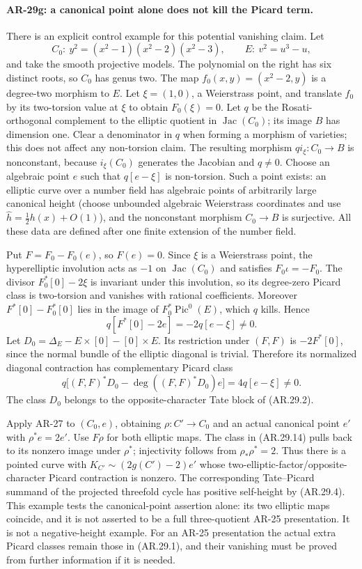 \paragraph{AR-29g: a canonical point alone does not kill the Picard term.}
There is an explicit control example for this potential vanishing claim.
Let
\[
 C_0:\ y^2=(x^2-1)(x^2-2)(x^2-3),\qquad
 E:\ v^2=u^3-u,
\]
and take the smooth projective models.  The polynomial on the
right has six distinct roots, so $C_0$ has genus two.  The map
$f_0(x,y)=(x^2-2,y)$ is a degree-two morphism to $E$.
Let $\xi=(1,0)$, a Weierstrass point, and translate $f_0$ by
its two-torsion value at $\xi$ to obtain $F_0(\xi)=0$.
Let $q$ be the Rosati-orthogonal complement to the elliptic
quotient in $\operatorname{Jac}(C_0)$; its image $B$ has
dimension one.  Clear a denominator in $q$ when forming a
morphism of varieties; this does not affect any non-torsion claim.
The resulting morphism $q i_\xi:C_0\to B$ is nonconstant,
because $i_\xi(C_0)$ generates the Jacobian and $q\ne0$.
Choose an algebraic point $e$ such that
$q[e-\xi]$ is non-torsion.  Such a point exists: an elliptic
curve over a number field has algebraic points of arbitrarily
large canonical height (choose unbounded algebraic Weierstrass
coordinates and use $\widehat h=\tfrac12 h(x)+O(1)$), and the
nonconstant morphism $C_0\to B$ is surjective.  All these data
are defined after one finite extension of the number field.

Put $F=F_0-F_0(e)$, so $F(e)=0$.  Since $\xi$ is a
Weierstrass point, the hyperelliptic involution acts as $-1$ on
$\operatorname{Jac}(C_0)$ and satisfies $F_0\iota=-F_0$.
The divisor $F_0^*[0]-2\xi$ is invariant under this involution,
so its degree-zero Picard class is two-torsion and vanishes with
rational coefficients.  Moreover
$F^*[0]-F_0^*[0]$ lies in the image of $F_0^*\operatorname{Pic}^0(E)$,
which $q$ kills.  Hence
\[
 q[F^*[0]-2e]=-2q[e-\xi]\ne0.                         \tag{AR.29.13}
\]
Let $D_0=\Delta_E-E\times[0]-[0]\times E$.
Its restriction under $(F,F)$ is $-2F^*[0]$, since the normal
bundle of the elliptic diagonal is trivial.  Therefore its
normalized diagonal contraction has complementary Picard class
\[
 q\bigl[(F,F)^*D_0-\deg((F,F)^*D_0)e\bigr]
     =4q[e-\xi]\ne0.                                 \tag{AR.29.14}
\]
The class $D_0$ belongs to the opposite-character Tate block
of (AR.29.2).

Apply AR-27 to $(C_0,e)$, obtaining $\rho:C'\to C_0$ and an
actual canonical point $e'$ with $\rho^*e=2e'$.
Use $F\rho$ for both elliptic maps.  The class in (AR.29.14)
pulls back to its nonzero image under $\rho^*$; injectivity
follows from $\rho_*\rho^*=2$.
Thus there is a pointed curve with $K_{C'}\sim(2g(C')-2)e'$
whose two-elliptic-factor/opposite-character Picard contraction
is nonzero.  The corresponding Tate--Picard summand of the
projected threefold cycle has positive self-height by (AR.29.4).
This example tests the canonical-point assertion alone: its two
elliptic maps coincide, and it is not asserted to be a full
three-quotient AR-25 presentation.  It is not a negative-height
example.  For an AR-25 presentation the actual extra Picard
classes remain those in (AR.29.1), and their vanishing must be
proved from further information if it is needed.
